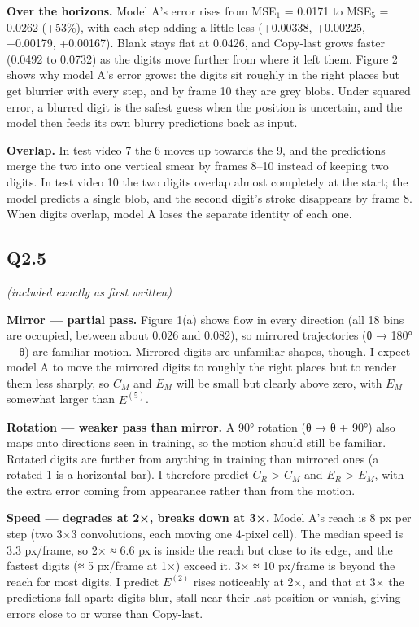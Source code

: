 \documentclass[11pt]{article}
\begin{document}
\textbf{Over the horizons.} Model A's error rises from MSE\(_1\) = 0.0171 to MSE\(_5\) = 0.0262 (+53\%), with each step adding a little less (+0.00338, +0.00225, +0.00179, +0.00167). Blank stays flat at 0.0426, and Copy-last grows faster (0.0492 to 0.0732) as the digits move further from where it left them. Figure 2 shows why model A's error grows: the digits sit roughly in the right places but get blurrier with every step, and by frame 10 they are grey blobs. Under squared error, a blurred digit is the safest guess when the position is uncertain, and the model then feeds its own blurry predictions back as input.

\textbf{Overlap.} In test video 7 the 6 moves up towards the 9, and the predictions merge the two into one vertical smear by frames 8--10 instead of keeping two digits. In test video 10 the two digits overlap almost completely at the start; the model predicts a single blob, and the second digit's stroke disappears by frame 8. When digits overlap, model A loses the separate identity of each one.


\subsection*{Q2.5}
\textit{(included exactly as first written)}

\textbf{Mirror --- partial pass.} Figure 1(a) shows flow in every direction (all 18 bins are occupied, between about 0.026 and 0.082), so mirrored trajectories (θ → 180° − θ) are familiar motion. Mirrored digits are unfamiliar shapes, though. I expect model A to move the mirrored digits to roughly the right places but to render them less sharply, so \(C_M\) and \(E_M\) will be small but clearly above zero, with \(E_M\) somewhat larger than \(E^{(5)}\).

\textbf{Rotation --- weaker pass than mirror.} A 90° rotation (θ → θ + 90°) also maps onto directions seen in training, so the motion should still be familiar. Rotated digits are further from anything in training than mirrored ones (a rotated 1 is a horizontal bar). I therefore predict \(C_R\) \textgreater{} \(C_M\) and \(E_R\) \textgreater{} \(E_M\), with the extra error coming from appearance rather than from the motion.

\textbf{Speed --- degrades at 2×, breaks down at 3×.} Model A's reach is 8 px per step (two 3×3 convolutions, each moving one 4-pixel cell). The median speed is 3.3 px/frame, so 2× ≈ 6.6 px is inside the reach but close to its edge, and the fastest digits (≈ 5 px/frame at 1×) exceed it. 3× ≈ 10 px/frame is beyond the reach for most digits. I predict \(E^{(2)}\) rises noticeably at 2×, and that at 3× the predictions fall apart: digits blur, stall near their last position or vanish, giving errors close to or worse than Copy-last.
\end{document}
